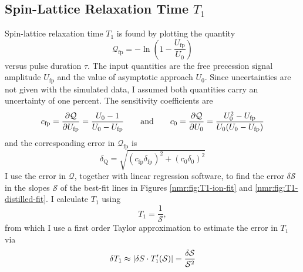 \documentclass[11pt, a4paper]{article}
\newcommand{\eqtext}[1]{\qquad \text{#1} \qquad}
\begin{document}
\subsection{Spin-Lattice Relaxation Time $ T_{1} $}
Spin-lattice relaxation time $ T_{1} $ is found by plotting the quantity
\begin{equation*}
	\mathcal{Q}_{\text{fp}}= -\ln\left(1 - \frac{U_{\text{fp}}}{U_{0}}\right)
\end{equation*}
versus pulse duration $ \tau $. The input quantities are the free precession signal amplitude $ U_{\text{fp}} $ and the value of asymptotic approach $ U_{0} $. Since uncertainties are not given with the simulated data, I assumed both quantities carry an uncertainty of one percent. The sensitivity coefficients are
\begin{equation*}
	c_{\text{fp}} = \pdv{\mathcal{Q}}{U_{\text{fp}}} = \frac{U_{0}-1}{U_{0} - U_{\text{fp}}} \eqtext{and} c_{0} = \pdv{\mathcal{Q}}{U_{0}} = \frac{U_{0}^{2}-U_{\text{fp}}}{U_{0}(U_{0} - U_{\text{fp}})}
\end{equation*}
and the corresponding error in $ \mathcal{Q}_{\text{fp}} $ is
\begin{equation*}
	\delta_{\text{Q}} = \sqrt{(c_{\text{fp}}\delta_{\text{fp}})^{2} + (c_{0}\delta_{0})^{2}}
\end{equation*}
I use the error in $ \mathcal{Q} $, together with linear regression software, to find the error $ \delta \mathcal{S} $ in the slopes $ \mathcal{S} $ of the best-fit lines in Figures \ref{nmr:fig:T1-ion-fit} and \ref{nmr:fig:T1-distilled-fit}.  I calculate $ T_{1} $ using
\begin{equation*}
	T_{1} = \frac{1}{\mathcal{S}},
\end{equation*}
from which I use a first order Taylor approximation to estimate the error in $ T_{1} $ via
\begin{equation*}
	\delta T_{1} \approx \abs{\delta S \cdot T_{1}'(\mathcal{S})} =  \frac{\delta \mathcal{S}}{\mathcal{S}^{2}}
\end{equation*}
\end{document}
